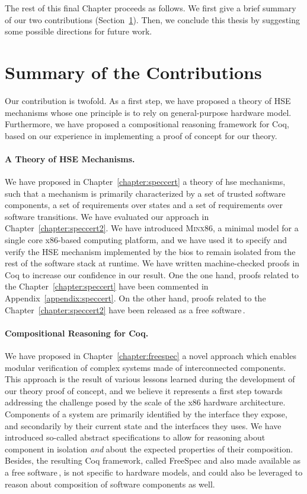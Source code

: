 The rest of this final Chapter proceeds as follows.
%
We first give a brief summary of our two contributions
(Section~\ref{sec:conclusion:summary}).
%
Then, we conclude this thesis by suggesting some possible directions for future
work.

\section{Summary of the Contributions}
\label{sec:conclusion:summary}

Our contribution is twofold.
%
As a first step, we have proposed a theory of HSE mechanisms whose one principle
is to rely on general-purpose hardware model.
%
Furthermore, we have proposed a compositional reasoning framework for Coq, based
on our experience in implementing a proof of concept for our theory.

\paragraph{A Theory of HSE Mechanisms.}
%
We have proposed in Chapter~\ref{chapter:speccert} a theory of \ac{hse}
mechanisms, such that a mechanism is primarily characterized by a set of trusted
software components, a set of requirements over states and a set of requirements
over software transitions.
%
We have evaluated our approach in Chapter~\ref{chapter:speccert2}.
%
We have introduced {\scshape Minx86}, a minimal model for a single core
x86-based computing platform, and we have used it to specify and verify the HSE
mechanism implemented by the \ac{bios} to remain isolated from the rest of the
software stack at runtime.
%
We have written machine-checked proofs in Coq to increase our confidence in our
result.
%
One the one hand, proofs related to the Chapter~\ref{chapter:speccert} have been
commented in Appendix~\ref{appendix:speccert}.
%
On the other hand, proofs related to the Chapter~\ref{chapter:speccert2} have
been released as a free software\,\cite{letan2016speccertcode}.

\paragraph{Compositional Reasoning for Coq.}
%
We have proposed in Chapter~\ref{chapter:freespec} a novel approach which
enables modular verification of complex systems made of interconnected
components.
%
This approach is the result of various lessons learned during the development of
our theory proof of concept, and we believe it represents a first step towards
addressing the challenge posed by the scale of the x86 hardware architecture.
%
Components of a system are primarily identified by the interface they expose,
and secondarily by their current state and the interfaces they uses.
%
We have introduced so-called abstract specifications to allow for reasoning
about component in isolation \emph{and} about the expected properties of their
composition.
%
Besides, the resulting Coq framework, called FreeSpec and also made available as
a free software\,\cite{letan2018freespeccode}, is not specific to hardware
models, and could also be leveraged to reason about composition of software
components as well.

